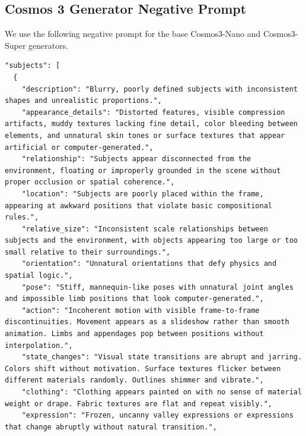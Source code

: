 

\subsection{Cosmos 3 Generator Negative Prompt}
\label{appendix:generator_negative_prompt}

We use the following negative prompt for the base Cosmos3-Nano and Cosmos3-Super generators.

\begin{tcolorbox}[
    breakable,
    colback=black!2,
    colframe=nvidiagreen!75!white,
    boxrule=0.4pt,
    arc=1pt,
    left=4pt,
    right=4pt,
    top=4pt,
    bottom=4pt,
    title=Cosmos 3 Base Generator Negative Prompt,
]
\begin{Verbatim}[breaklines=true,breakanywhere=true,fontsize=\scriptsize]
"subjects": [
  {
    "description": "Blurry, poorly defined subjects with inconsistent shapes and unrealistic proportions.",
    "appearance_details": "Distorted features, visible compression artifacts, muddy textures lacking fine detail, color bleeding between elements, and unnatural skin tones or surface textures that appear artificial or computer-generated.",
    "relationship": "Subjects appear disconnected from the environment, floating or improperly grounded in the scene without proper occlusion or spatial coherence.",
    "location": "Subjects are poorly placed within the frame, appearing at awkward positions that violate basic compositional rules.",
    "relative_size": "Inconsistent scale relationships between subjects and the environment, with objects appearing too large or too small relative to their surroundings.",
    "orientation": "Unnatural orientations that defy physics and spatial logic.",
    "pose": "Stiff, mannequin-like poses with unnatural joint angles and impossible limb positions that look computer-generated.",
    "action": "Incoherent motion with visible frame-to-frame discontinuities. Movement appears as a slideshow rather than smooth animation. Limbs and appendages pop between positions without interpolation.",
    "state_changes": "Visual state transitions are abrupt and jarring. Colors shift without motivation. Surface textures flicker between different materials randomly. Outlines shimmer and vibrate.",
    "clothing": "Clothing appears painted on with no sense of material weight or drape. Fabric textures are flat and repeat visibly.",
    "expression": "Frozen, uncanny valley expressions or expressions that change abruptly without natural transition.",

\end{Verbatim}
\end{tcolorbox}
